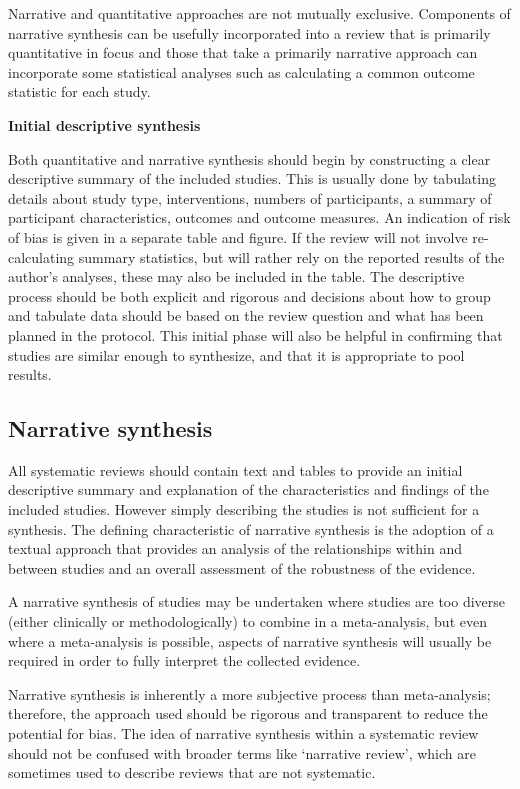 \documentclass[
  10pt,
  a4paper,
  DIV=11,
  numbers=noendperiod]{scrreprt}
\begin{document}
Narrative and quantitative approaches are not mutually exclusive.
Components of narrative synthesis can be usefully incorporated into a
review that is primarily quantitative in focus and those that take a
primarily narrative approach can incorporate some statistical analyses
such as calculating a common outcome statistic for each study.

\textbf{Initial descriptive synthesis}

Both quantitative and narrative synthesis should begin by constructing a
clear descriptive summary of the included studies. This is usually done
by tabulating details about study type, interventions, numbers of
participants, a summary of participant characteristics, outcomes and
outcome measures. An indication of risk of bias is given in a separate
table and figure. If the review will not involve re-calculating summary
statistics, but will rather rely on the reported results of the author's
analyses, these may also be included in the table. The descriptive
process should be both explicit and rigorous and decisions about how to
group and tabulate data should be based on the review question and what
has been planned in the protocol. This initial phase will also be
helpful in confirming that studies are similar enough to synthesize, and
that it is appropriate to pool results.

\subsection{Narrative synthesis}\label{narrative-synthesis}

All systematic reviews should contain text and tables to provide an
initial descriptive summary and explanation of the characteristics and
findings of the included studies. However simply describing the studies
is not sufficient for a synthesis. The defining characteristic of
narrative synthesis is the adoption of a textual approach that provides
an analysis of the relationships within and between studies and an
overall assessment of the robustness of the evidence.

A narrative synthesis of studies may be undertaken where studies are too
diverse (either clinically or methodologically) to combine in a
meta-analysis, but even where a meta-analysis is possible, aspects of
narrative synthesis will usually be required in order to fully interpret
the collected evidence.

Narrative synthesis is inherently a more subjective process than
meta-analysis; therefore, the approach used should be rigorous and
transparent to reduce the potential for bias. The idea of narrative
synthesis within a systematic review should not be confused with broader
terms like `narrative review', which are sometimes used to describe
reviews that are not systematic.
\end{document}
